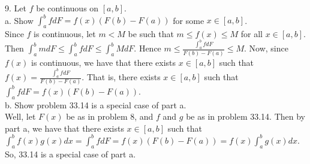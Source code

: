 \documentclass[12pt]{article}
\begin{document}
9. Let $f$ be continuous on $[a,b]$.\\
a. Show $\int_a^bfdF=f(x)(F(b)-F(a))$ for some $x\in[a,b]$.\\
Since $f$ is continuous, let $m<M$ be such that $m\leq f(x)\leq M$ for all $x\in[a,b]$. Then $\int_a^bmdF\leq\int_a^bfdF\leq\int_a^bMdF$. Hence $m\leq\frac{\int_a^bfdF}{F(b)-F(a)}\leq M$. Now, since $f(x)$ is continuous, we have that there exists $x\in[a,b]$ such that $f(x)=\frac{\int_a^bfdF}{F(b)-F(a)}$. That is, there exists $x\in[a,b]$ such that $\int_a^bfdF=f(x)(F(b)-F(a))$.\\
b. Show problem 33.14 is a special case of part a.\\
Well, let $F(x)$ be as in problem 8, and $f$ and $g$ be as in problem 33.14. Then by part a, we have that there exists $x\in[a,b]$ such that $\int_a^bf(x)g(x)dx=\int_a^bfdF=f(x)(F(b)-F(a))=f(x)\int_a^bg(x)dx$. So, 33.14 is a special case of part a.
\end{document}
